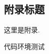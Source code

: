 
\newpage

\begin{appendices}
    \renewcommand{\thesection}{\Alph{section}}
    \section{附录标题}
    这里是附录. 

    代码环境测试






\end{appendices}
